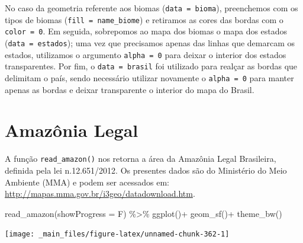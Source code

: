 \documentclass[
  brazilian,
]{book}
\newenvironment{Shaded}{\begin{snugshade}}{\end{snugshade}}
\newcommand{\AttributeTok}[1]{\textcolor[rgb]{0.77,0.63,0.00}{#1}}
\newcommand{\FunctionTok}[1]{\textcolor[rgb]{0.00,0.00,0.00}{#1}}
\newcommand{\NormalTok}[1]{#1}
\newcommand{\SpecialCharTok}[1]{\textcolor[rgb]{0.00,0.00,0.00}{#1}}
\begin{document}
No caso da geometria referente aos biomas (\texttt{data\ =\ bioma}), preenchemos com os tipos de biomas (\texttt{fill\ =\ name\_biome}) e retiramos as cores das bordas com o \texttt{color\ =\ 0}. Em seguida, sobrepomos ao mapa dos biomas o mapa dos estados (\texttt{data\ =\ estados}); uma vez que precisamos apenas das linhas que demarcam os estados, utilizamos o argumento \texttt{alpha\ =\ 0} para deixar o interior dos estados transparentes. Por fim, o \texttt{data\ =\ brasil} foi utilizado para realçar as bordas que delimitam o país, sendo necessário utilizar novamente o \texttt{alpha\ =\ 0} para manter apenas as bordas e deixar transparente o interior do mapa do Brasil.

\hypertarget{amazuxf4nia-legal}{%
\section{Amazônia Legal}\label{amazuxf4nia-legal}}

A função \texttt{read\_amazon()} nos retorna a área da Amazônia Legal Brasileira, definida pela lei n.12.651/2012. Os presentes dados são do Ministério do Meio Ambiente (MMA) e podem ser acessados em: \url{http://mapas.mma.gov.br/i3geo/datadownload.htm}.

\begin{Shaded}
\begin{Highlighting}[]
\FunctionTok{read\_amazon}\NormalTok{(}\AttributeTok{showProgress =}\NormalTok{ F) }\SpecialCharTok{\%\textgreater{}\%}
  \FunctionTok{ggplot}\NormalTok{()}\SpecialCharTok{+}
  \FunctionTok{geom\_sf}\NormalTok{()}\SpecialCharTok{+}
  \FunctionTok{theme\_bw}\NormalTok{()}
\end{Highlighting}
\end{Shaded}

\begin{center}\texttt{[image: \_main\_files/figure-latex/unnamed-chunk-362-1]} \end{center}
\end{document}

